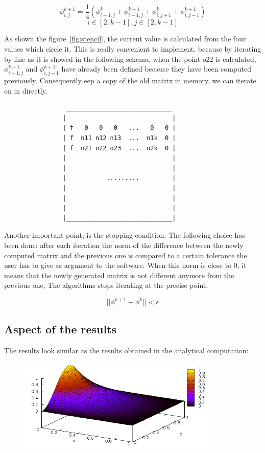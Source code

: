 \documentclass[a4paper,11pt]{article}
\begin{document}
$$\phi^{k+1}_{i,j} = \frac{1}{4}(\phi^{k}_{i+1,j} + \phi^{k+1}_{i-1,j} + \phi^{k}_{i,j+1} + \phi^{k+1}_{i,j-1})$$
$$i \in [2;k-1], j \in [2;k-1]$$

\vspace{1em}

As shown the figure~\ref{fig:stencil}, the current value is calculated from the four values which circle it.
This is really convenient to implement, because by iterating by line as it is showed in the following schema, when
the point $o22$ is calculated, $\phi^{k+1}_{i-1,j}$ and $\phi^{k+1}_{i,j-1}$ have already been defined because they have been
computed previously. Consequently eep a copy of the old matrix in memory, we can iterate
on in directly.
  
\begin{verbatim}
                 _____________________________
                |                             |
                | f   0   0   0   ...   0   0 |
                | f  n11 n12 n13  ...  n1k  0 |
                | f  n21 o22 o23  ...  o2k  0 |
                |                             |
                |                             |
                |           .........         |
                |                             |
                |                             |
                |                             |
                |_____________________________|
\end{verbatim}

Another important point, is the stopping condition. The following choice has been done: after each iteration 
the norm of the difference between the newly computed matrix and the previous one is compared to a certain tolerance
the user has to give as argument to the software. When this norm is close to 0, it means that the newly generated matrix is
not different anymore from the previous one, The algorithms stops iterating at the precise point.

\[
  ||\phi^{k+1} - \phi^{k}|| < \epsilon
\]

\subsection{Aspect of the results}

The results look similar as the results obtained in the analytical computation:

\begin{figure}[h!]
  \centering
  \includegraphics[width=0.85\textwidth]{images/serial-results.png}
\end{figure}
\end{document}
